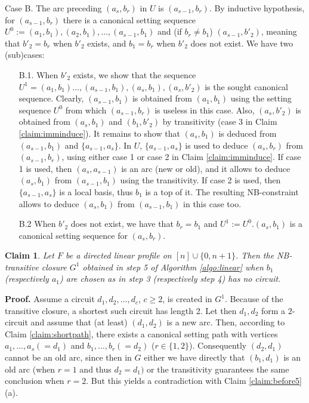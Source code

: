 \documentclass{article}
\newtheorem{fait}{Claim}
\newcommand{\bfn}{\begin{fait}}
\newcommand{\efn}{\end{fait}}
\begin{document}
Case B. The arc preceding $(a_s,b_r)$ in $U$ is $(a_{s-1},b_r)$. By inductive hypothesis, for
$(a_{s-1},b_r)$ there is a canonical setting sequence $U^0:=(a_1,b_1), (a_2,b_1), \ldots ,(a_{s-1},b_1)$ and (if $b_r\neq b_1$) $(a_{s-1},b'_2)$, meaning that $b'_2=b_{r}$ when $b'_2$
exists, and $b_1=b_{r}$ when $b'_2$ does not exist. We have two (sub)cases:

\begin{enumerate} 
\item[B.1.]  When $b'_2$ exists, we show that the sequence 
$U^1=(a_1,b_1)\ldots, (a_{s-1},b_1), (a_s,b_1), (a_s,b'_2)$ is the sought canonical sequence.
Clearly, $(a_{s-1},b_1)$ is obtained from $(a_1,b_1)$ using the setting sequence $U^0$
from which $(a_{s-1}, b_r)$ is useless in this case. Also, $(a_s, b'_2)$ is obtained from
$(a_s, b_1)$ and $(b_1,b'_2)$ by transitivity (case 3 in Claim \ref{claim:imminduce}).
It remains to show that $(a_s,b_1)$ is deduced from $(a_{s-1},b_1)$ and $\{a_{s-1}, a_s\}$.
In $U$, $\{a_{s-1}, a_s\}$ is used to deduce $(a_s,b_r)$ from $(a_{s-1},b_{r})$,
using either case 1 or case 2 in Claim \ref{claim:imminduce}. If case 1 is used, then
$(a_s,a_{s-1})$ is an arc (new or old), and it allows to deduce $(a_s,b_1)$ from 
$(a_{s-1},b_{1})$ using the transitivity. If case 2 is used, then $\{a_{s-1}, a_s\}$
is a local basis, thus $b_1$ is a top of it. The resulting NB-constraint allows to deduce
$(a_s,b_1)$ from  $(a_{s-1},b_{1})$ in this case too. 
\item[B.2] When $b'_2$ does not exist, we have that $b_r=b_1$ and $U^1:=U^0.(a_s,b_1)$
is a canonical setting sequence for $(a_s,b_r)$.


 

\end{enumerate}


\bfn
Let $F$ be a directed linear profile on  $[n]\cup\{0,n+1\}$. Then 
the NB-transitive closure $G^1$ obtained in step  5 of Algorithm \ref{algo:linear} 
when $b_1$ (respectively $a_1$) are chosen as in step 3 (respectively step 4) has no circuit.
\label{claim:circuit}
\efn


{\bf Proof.} Assume a circuit $d_1,d_2, \ldots, d_c$, $c\geq 2$, is created in $G^1$. Because of
the transitive closure, a shortest such circuit has length 2. Let then $d_1,d_2$ form
a $2$-circuit and
assume that (at least) $(d_1,d_2)$ is a new arc. Then, according to Claim \ref{claim:shortpath},
there exists a canonical setting path with vertices $a_1, \ldots, a_s(=d_1)$ and 
$b_1, \ldots, b_r (=d_2)$  ($r\in\{1,2\}$).  
Consequently $(d_2,d_1)$ cannot be an old arc, since then
in $G$ either we have directly that $(b_1,d_1)$ is an old arc (when $r=1$ and thus $d_2=d_1)$
or the transitivity guarantees the same conclusion when $r=2$. But this  yields  a contradiction 
with Claim \ref{claim:before5}(a).
\end{document}
